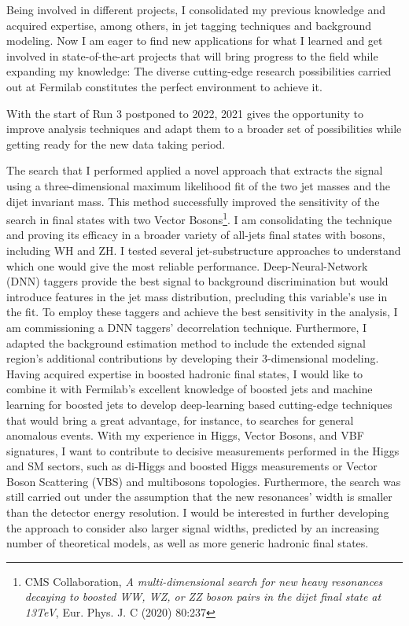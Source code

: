 {\begin{flushleft}
 Being involved in different projects, I consolidated my previous knowledge and acquired expertise, among others, in jet tagging techniques and background modeling. Now I am eager to find new applications for what I learned and get involved in state-of-the-art projects that will bring progress to the field while expanding my knowledge: The diverse cutting-edge research possibilities carried out at Fermilab constitutes the perfect environment to achieve it.

\vspace{\baselineskip}

With the start of Run 3 postponed to 2022, 2021 gives the opportunity to improve analysis techniques and adapt them to a broader set of possibilities while getting ready for the new data taking period. 


\vspace{\baselineskip}


The search that I performed applied a novel approach that extracts the signal using a three-dimensional maximum likelihood fit of the two jet masses and the dijet invariant mass. This method successfully improved the sensitivity of the search in final states with two Vector Bosons\footnote{CMS Collaboration, {\em A multi-dimensional search for new heavy resonances decaying to boosted WW, WZ, or ZZ boson pairs in the dijet final state at 13TeV}, Eur. Phys. J. C (2020) 80:237}.
I am consolidating the technique and proving its efficacy in a broader variety of all-jets final states with bosons, including WH and ZH.
I tested several jet-substructure approaches to understand which one would give the  most reliable performance. Deep-Neural-Network (DNN) taggers provide the best signal to background discrimination but would introduce features in the jet mass distribution, precluding this variable's use in the fit. To employ these taggers and achieve the best sensitivity in the analysis, I am commissioning a DNN taggers' decorrelation technique. Furthermore, I adapted the background estimation method to include the extended signal region's additional contributions by developing their 3-dimensional modeling. 
Having acquired expertise in boosted hadronic final states, I would like to combine it with Fermilab's excellent knowledge of boosted jets and machine learning for boosted jets to develop deep-learning based cutting-edge techniques that would bring a great advantage, for instance, to searches for general anomalous events. With my experience in Higgs, Vector Bosons, and VBF signatures, I want to contribute to decisive measurements performed in the Higgs and SM sectors, such as di-Higgs and boosted Higgs measurements or Vector Boson Scattering (VBS) and multibosons topologies. 
Furthermore, the search was still carried out under the assumption that the new resonances' width is smaller than the detector energy resolution. I would be interested in further developing the approach to consider also larger signal widths, predicted by an increasing number of theoretical models, as well as more generic hadronic final states.


\end{flushleft}}
